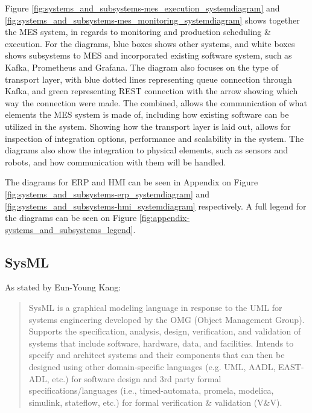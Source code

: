 Figure \ref{fig:systems_and_subsystems-mes_execution_systemdiagram} and \ref{fig:systems_and_subsystems-mes_monitoring_systemdiagram} shows together the MES system, in regards to monitoring and production scheduling \& execution.
For the diagrams, blue boxes shows other systems, and white boxes shows subsystems to MES and incorporated existing software system, such as Kafka, Prometheus and Grafana.
The diagram also focuses on the type of transport layer, with blue dotted lines representing queue connection through Kafka, and green representing REST connection with the arrow showing which way the connection were made.
The combined, allows the communication of what elements the MES system is made of, including how existing software can be utilized in the system. Showing how the transport layer is laid out, allows for inspection of integration options, performance and scalability in the system.
The diagrams also show the integration to physical elements, such as sensors and robots, and how communication with them will be handled.


The diagrams for ERP and HMI can be seen in Appendix on Figure \ref{fig:systems_and_subsystems-erp_systemdiagram} and \ref{fig:systems_and_subsystems-hmi_systemdiagram} respectively. A full legend for the diagrams can be seen on Figure \ref{fig:appendix-systems_and_subsystems_legend}. 

\subsection{SysML}
As stated by Eun-Young Kang:
\begin{quote}
SysML is a graphical modeling language in response to the UML for systems engineering developed by the OMG (Object Management Group). Supports the specification, analysis, design, verification, and validation of systems that include software, hardware, data, and facilities. Intends to specify and architect systems and their components that can then be designed using other domain-specific languages (e.g. UML, AADL, EAST-ADL, etc.) for software design and 3rd party formal  specifications/languages (i.e., timed-automata, promela, modelica, simulink, stateflow, etc.) for formal verification \& validation (V\&V). \cite{EYKlecture4}
\end{quote}

